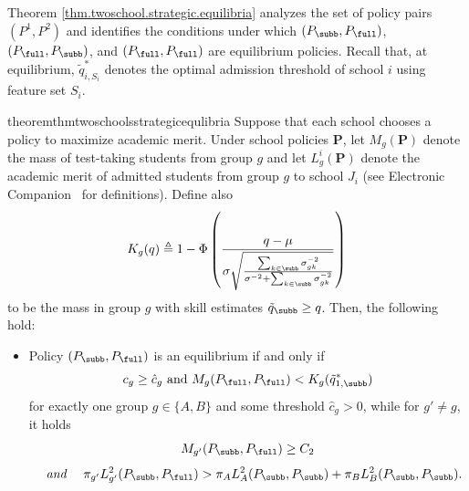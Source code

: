 {Theorem \ref{thm.twoschool.strategic.equilibria} analyzes the set of policy pairs $(P^1, P^2)$ and identifies the conditions under which $(P_{\subb}, P_{\full})$, $(P_{\full}, P_{\subb})$, and $(P_{\full}, P_{\full})$ are equilibrium policies.} Recall that, at equilibrium, $\tilde{q}^*_{i, S_i}$ denotes the optimal admission threshold of school $i$ using feature set $S_i$.




\begin{restatable}{theorem}{thmtwoschoolsstrategicequlibria}
\label{thm.twoschool.strategic.equilibria}
Suppose that each school chooses a policy to maximize academic merit.
 Under school policies $\mathbf{P}$, let $M_g (\mathbf{P})$ denote the mass of test-taking students from group $g$ and let $L^i_g (\mathbf{P})$ denote the academic merit of admitted students from group $g$ to school $J_i$ (see Electronic Companion~ for definitions).
 Define also
 $$K_g (q)  \triangleq 1- \Phi\left(\frac{q - \mu}{\sigma \sqrt{\frac{\sum_{k\in \subb} \sigma_{gk}^{-2}}{\sigma^{-2} + \sum_{k \in \subb} \sigma_{gk}^{-2}} }}\right)$$ to be the mass in group $g$ with skill estimates $\tilde q_{\subb} \geq q$.
 Then, the following hold:
\begin{itemize}
    \item[(i)]  Policy $(P_{\subb}, P_{\full})$ is an equilibrium if and only if
     \begin{equation}
    \label{eq.condition.drop.twoschools.strategic.J1}
       c_g \geq \hat{c}_g \mathrm{~and~} M_g ({P}_{\full}, P_{\full}) <
       K_g (\tilde q^*_{1, \subb})
        \end{equation}
        for exactly one group $g \in \{A, B\}$ and some threshold $\hat{c}_g >0$, while for $g' \neq g$, it holds
            \begin{equation}
                \label{eq.sub.full.J2.cond1}
                M_{g'} (P_{\subb}, P_{\full}) \geq C_2
            \end{equation}
\begin{equation}
\label{eq.sub.full.J2.cond2}
\mathrm{~~~\textit{and}~~~~}
\pi_{g'}L^2_{g'} (P_{\subb}, P_{\full}) >  \pi_A L^2_{A} (P_{\subb}, P_{\subb}) + \pi_B L^2_{B} (P_{\subb}, P_{\subb}).
\end{equation}



\end{itemize}
\end{restatable}
